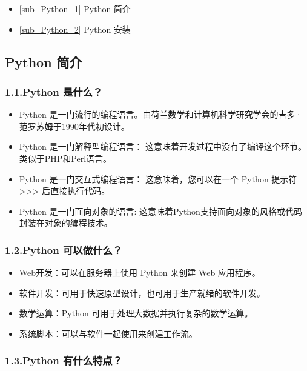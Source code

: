 
\begin{itemize}
\item \autoref{sub_Python_1} Python 简介
\item \autoref{sub_Python_2} Python 安装
\end{itemize}

\subsection{Python 简介}\label{sub_Python_1}

\subsubsection{1.1.Python 是什么？}

\begin{itemize}
\item Python 是一门流行的编程语言。由荷兰数学和计算机科学研究学会的吉多·范罗苏姆于1990年代初设计。
\item Python 是一门解释型编程语言： 这意味着开发过程中没有了编译这个环节。类似于PHP和Perl语言。
\item Python 是一门交互式编程语言： 这意味着，您可以在一个 Python 提示符 >>> 后直接执行代码。
\item Python 是一门面向对象的语言: 这意味着Python支持面向对象的风格或代码封装在对象的编程技术。
\end{itemize}
 
\subsubsection{1.2.Python 可以做什么？}
\begin{itemize}
\item Web开发：可以在服务器上使用 Python 来创建 Web 应用程序。
\item 软件开发：可用于快速原型设计，也可用于生产就绪的软件开发。
\item 数学运算：Python 可用于处理大数据并执行复杂的数学运算。
\item 系统脚本：可以与软件一起使用来创建工作流。
\end{itemize}

\subsubsection{1.3.Python 有什么特点？}


